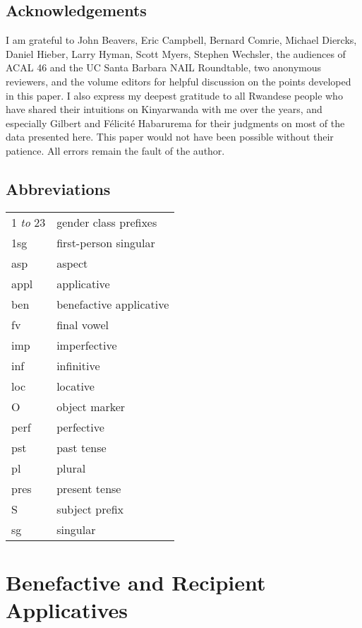 \documentclass[output=paper]{langsci/langscibook}
\begin{document}
\subsection*{Acknowledgements}
I am grateful to John Beavers, Eric Campbell, Bernard Comrie, Michael Diercks, Daniel Hieber, Larry Hyman, Scott Myers, Stephen Wechsler, the audiences of ACAL 46 and the UC Santa Barbara NAIL Roundtable, two anonymous reviewers, and the volume editors for helpful discussion on the points developed in this paper. I also express my deepest gratitude to all Rwandese people who have shared their intuitions on Kinyarwanda with me over the years, and especially Gilbert and F\'elicit\'e Habarurema for their judgments on most of the data presented here. This paper would not have been possible without their patience. All errors remain the fault of the author.


\subsection*{Abbreviations}
\begin{tabular}{ll}
 1 \emph{to} 23 &  gender class prefixes\\
 1{\sc sg} &  first-person singular\\
 {\sc asp} & aspect\\
 {\sc appl} & applicative\\
 {\sc ben}  & benefactive applicative\\
 {\sc fv} & final vowel\\
 {\sc imp} &  imperfective\\
 {\sc inf} &  infinitive\\
 {\sc loc} &  locative\\
  {\sc O} &  object marker\\
  {\sc perf} &  perfective\\
  {\sc pst} &  past tense\\
  {\sc pl} & plural\\
  {\sc pres} & present tense\\
  S  & subject prefix\\
  {\sc sg} & singular\\
\end{tabular}
% 





\section{Benefactive and Recipient Applicatives} %
\end{document}
